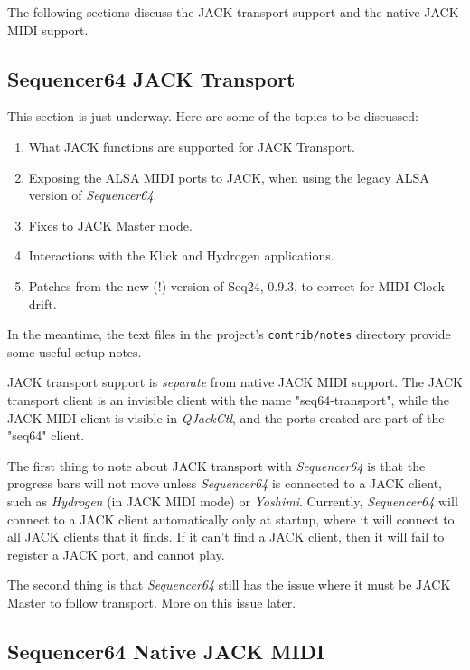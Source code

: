    The following sections discuss the JACK transport support and the native
   JACK MIDI support.

\subsection{Sequencer64 JACK Transport}
\label{subsec:seq64_jack_transport}

   This section is just underway.  Here are some of the topics to be discussed:

   \begin{enumerate}
      \item What JACK functions are supported for JACK Transport.
      \item Exposing the ALSA MIDI ports to JACK, when using the legacy
         ALSA version of \textsl{Sequencer64}.
      \item Fixes to JACK Master mode.
      \item Interactions with the Klick and Hydrogen applications.
      \item Patches from the new (!) version of Seq24, 0.9.3, to correct
         for MIDI Clock drift.
   \end{enumerate}

   In the meantime, the text files in the project's \texttt{contrib/notes}
   directory provide some useful setup notes.

   JACK transport support is \textsl{separate} from native JACK MIDI support.
   The JACK transport client is an invisible client with the
   name "seq64-transport", while the JACK MIDI client is visible in
   \textsl{QJackCtl}, and the ports created are part of the
   "seq64" client.

   The first thing to note about JACK transport with \textsl{Sequencer64} is
   that the progress bars will not move unless \textsl{Sequencer64} is
   connected to a JACK client, such as \textsl{Hydrogen} (in JACK MIDI mode)
   or \textsl{Yoshimi}.  Currently, \textsl{Sequencer64} will connect to a JACK
   client automatically only at startup, where it will connect to all JACK
   clients that it finds.  If it can't find a JACK client, then it will
   fail to register a JACK port, and cannot play.

   The second thing is that \textsl{Sequencer64} still has the issue where it
   must be JACK Master to follow transport.  More on this issue later.

\subsection{Sequencer64 Native JACK MIDI}
\label{subsec:seq64_jack_native_midi}

